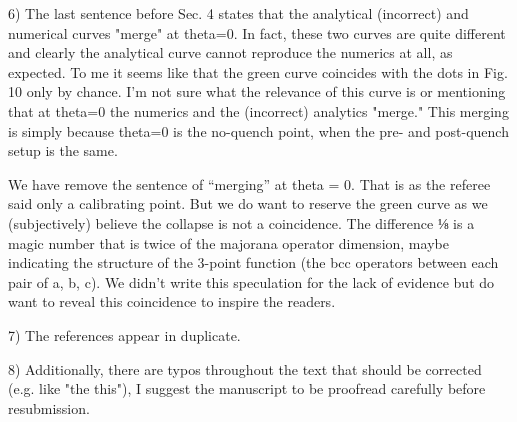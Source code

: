 \documentclass{article}
\newcommand{\reply}[1]{{\color{black}#1}}
\begin{document}
6) The last sentence before Sec. 4 states that the analytical (incorrect) and numerical curves "merge" at theta=0. In fact, these two curves are quite different and clearly the analytical curve cannot reproduce the numerics at all, as expected. To me it seems like that the green curve coincides with the dots in Fig. 10 only by chance. I'm not sure what the relevance of this curve is or mentioning that at theta=0 the numerics and the (incorrect) analytics "merge." This merging is simply because theta=0 is the no-quench point, when the pre- and post-quench setup is the same.

\reply{We have remove the sentence of ``merging'' at theta = 0. That is as the referee said only a calibrating point. But we do want to reserve the green curve as we (subjectively) believe the collapse is not a coincidence. The difference ⅛ is a magic number that is twice of the majorana operator dimension, maybe indicating the structure of the 3-point function (the bcc operators between each pair of  a, b, c). We didn't write this speculation for the lack of evidence but do want to reveal this coincidence to inspire the readers.}

7) The references appear in duplicate.

8) Additionally, there are typos throughout the text that should be corrected (e.g. like "the this"), I suggest the manuscript to be proofread carefully before resubmission. 
\end{document}
